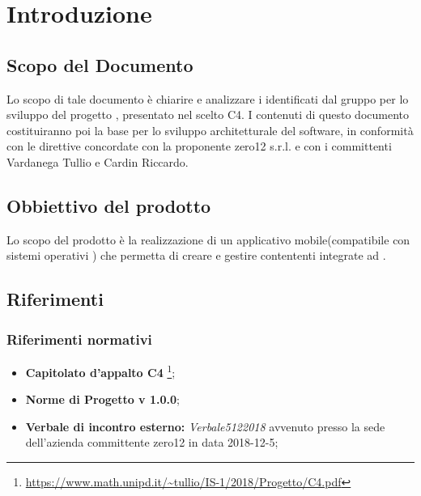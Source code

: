 \chapter{Introduzione}

\section{Scopo del Documento}
Lo scopo di tale documento è chiarire e analizzare i  identificati dal gruppo  per lo sviluppo del progetto , presentato nel  scelto C4.
I contenuti di questo documento costituiranno poi la base per lo sviluppo architetturale del software, in conformità con le direttive concordate con la proponente zero12 s.r.l. e con i committenti Vardanega Tullio e Cardin Riccardo.

\section{Obbiettivo del prodotto}
Lo scopo del prodotto è la realizzazione di un applicativo mobile(compatibile con sistemi operativi ) che permetta di creare e gestire  contententi  integrate ad .

\section{Riferimenti}

\subsection{Riferimenti normativi}
\begin{itemize}
	
	\item \textbf{Capitolato d'appalto C4} \footnote{\url{https://www.math.unipd.it/~tullio/IS-1/2018/Progetto/C4.pdf}};
	\item \textbf{Norme di Progetto v 1.0.0};
	\item \textbf{Verbale di incontro esterno:} \textit{Verbale5122018} avvenuto presso la sede dell'azienda committente zero12 in data 2018-12-5;

\end{itemize}

